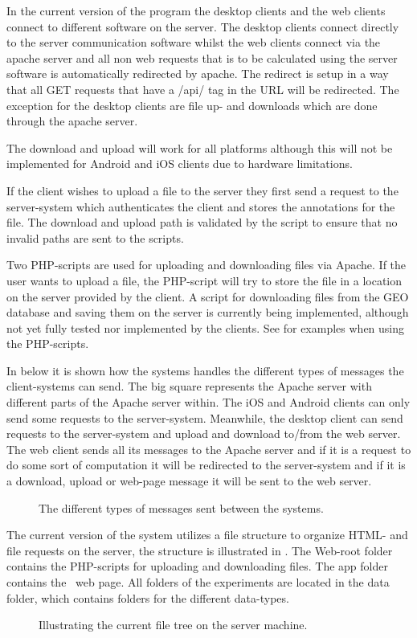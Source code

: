In the current version of the program the desktop clients and the web clients connect to different software on the server. The desktop clients connect directly to the server communication software whilst the web clients connect via the apache server and all non web requests that is to be calculated using the server software is automatically redirected by apache.
The redirect is setup in a way that all GET requests that have a /api/ tag in the URL will be redirected.
The exception for the desktop clients are file up- and downloads which are done through the apache server.

The download and upload will work for all platforms although this will not be implemented for Android and iOS clients due to hardware limitations.

If the client wishes to upload a file to the server they first send a request to the server-system which authenticates the client and stores the annotations for the file. The download and upload path is validated by the script to ensure that no invalid paths are sent to the scripts.

Two PHP-scripts are used for uploading and downloading files via Apache. If the user wants to upload a file, the PHP-script will try to store the file in a location on the server provided by the client. A script for downloading files from the GEO database and saving them on the server is currently being  implemented, although not yet fully tested nor implemented by the clients. See  for examples when using the PHP-scripts.

In  below it is shown how the systems handles the different types of messages the client-systems can send. The big square represents the Apache server with different parts of the Apache server within. The iOS and Android clients can only send some requests to the server-system. Meanwhile, the desktop client can send requests to the server-system and upload and download to/from the web server. The web client sends all its messages to the Apache server and if it is a request to do some sort of computation it will be redirected to the server-system and if it is a download, upload or web-page message it will be sent to the web server.

\begin{figure}[hbt]
\caption{The different types of messages sent between the systems.}
\label{fig:exp_flow}
\end{figure}

The current version of the system utilizes a file structure to organize HTML- and file requests on the server, the structure is illustrated in . The Web-root folder contains the PHP-scripts for uploading and downloading files. The app folder contains the \appName\ web page. All folders of the experiments are located in the data folder, which contains folders for the different data-types.

\begin{figure}[hbt]
\caption{Illustrating the current file tree on the server machine.}
\label{fig:exp_filestructure}
\end{figure}